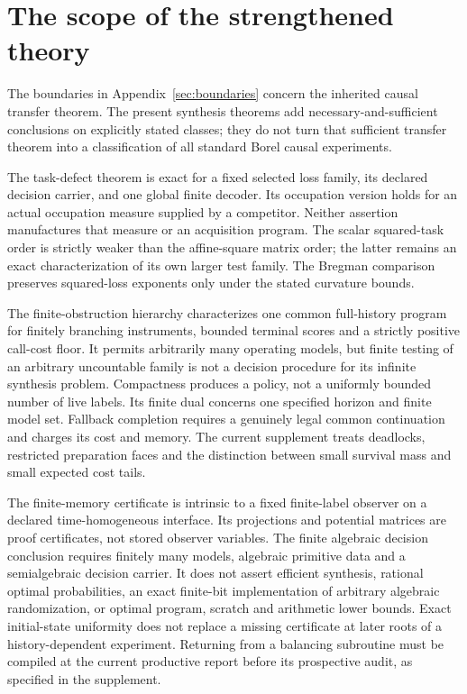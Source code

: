 \section{The scope of the strengthened theory}\label{sec:current-scope}
The boundaries in Appendix~\ref{sec:boundaries} concern the inherited causal transfer theorem. The present synthesis theorems add necessary-and-sufficient conclusions on explicitly stated classes; they do not turn that sufficient transfer theorem into a classification of all standard Borel causal experiments.

The task-defect theorem is exact for a fixed selected loss family, its declared decision carrier, and one global finite decoder. Its occupation version holds for an actual occupation measure supplied by a competitor. Neither assertion manufactures that measure or an acquisition program. The scalar squared-task order is strictly weaker than the affine-square matrix order; the latter remains an exact characterization of its own larger test family. The Bregman comparison preserves squared-loss exponents only under the stated curvature bounds.

The finite-obstruction hierarchy characterizes one common full-history program for finitely branching instruments, bounded terminal scores and a strictly positive call-cost floor. It permits arbitrarily many operating models, but finite testing of an arbitrary uncountable family is not a decision procedure for its infinite synthesis problem. Compactness produces a policy, not a uniformly bounded number of live labels. Its finite dual concerns one specified horizon and finite model set. Fallback completion requires a genuinely legal common continuation and charges its cost and memory. The current supplement treats deadlocks, restricted preparation faces and the distinction between small survival mass and small expected cost tails.

The finite-memory certificate is intrinsic to a fixed finite-label observer on a declared time-homogeneous interface. Its projections and potential matrices are proof certificates, not stored observer variables. The finite algebraic decision conclusion requires finitely many models, algebraic primitive data and a semialgebraic decision carrier. It does not assert efficient synthesis, rational optimal probabilities, an exact finite-bit implementation of arbitrary algebraic randomization, or optimal program, scratch and arithmetic lower bounds. Exact initial-state uniformity does not replace a missing certificate at later roots of a history-dependent experiment. Returning from a balancing subroutine must be compiled at the current productive report before its prospective audit, as specified in the supplement.

